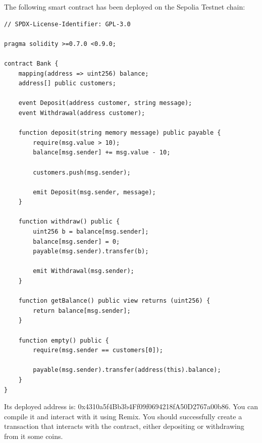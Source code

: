\documentclass[12pt,addpoints,answers]{exam}
\begin{document}
\begin{questions}
\newpage
  
\question The following smart contract has been deployed on the Sepolia Testnet chain:

{\footnotesize

\begin{verbatim}
// SPDX-License-Identifier: GPL-3.0

pragma solidity >=0.7.0 <0.9.0;

contract Bank {
    mapping(address => uint256) balance;
    address[] public customers;

    event Deposit(address customer, string message);
    event Withdrawal(address customer);

    function deposit(string memory message) public payable {
        require(msg.value > 10);
        balance[msg.sender] += msg.value - 10;

        customers.push(msg.sender);

        emit Deposit(msg.sender, message);
    }

    function withdraw() public {
        uint256 b = balance[msg.sender];
        balance[msg.sender] = 0;
        payable(msg.sender).transfer(b);

        emit Withdrawal(msg.sender);
    }

    function getBalance() public view returns (uint256) {
        return balance[msg.sender];
    }
    
    function empty() public {
        require(msg.sender == customers[0]);
        
        payable(msg.sender).transfer(address(this).balance);
    }
}
\end{verbatim}

} %

 Its deployed address is: 0x4310a5f4Bb3b4Ff09f0694218fA50D2767a00b86. You can compile it and interact with it using Remix. You should successfully create a transaction that interacts with the contract, either depositing or withdrawing from it some coins. 
 
\end{questions}
\end{document}
